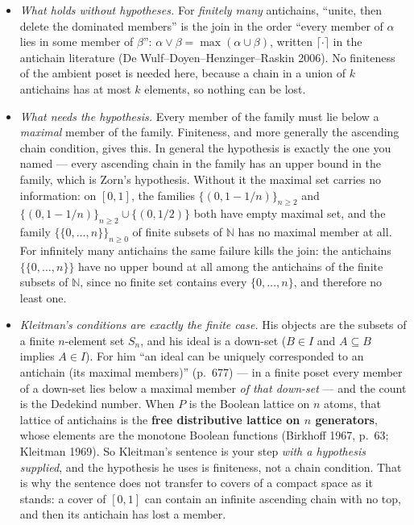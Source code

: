\documentclass[
]{article}
\providecommand{\tightlist}{%
  \setlength{\itemsep}{0pt}\setlength{\parskip}{0pt}}
\begin{document}
\begin{itemize}
\tightlist
\item
  \emph{What holds without hypotheses.} For \emph{finitely many}
  antichains, ``unite, then delete the dominated members'' is the join
  in the order ``every member of \(\alpha\) lies in some member of
  \(\beta\)'': \(\alpha\vee\beta=\max(\alpha\cup\beta)\), written
  \(\lceil\cdot\rceil\) in the antichain literature (De
  Wulf--Doyen--Henzinger--Raskin 2006). No finiteness of the ambient
  poset is needed here, because a chain in a union of \(k\) antichains
  has at most \(k\) elements, so nothing can be lost.
\item
  \emph{What needs the hypothesis.} Every member of the family must lie
  below a \emph{maximal} member of the family. Finiteness, and more
  generally the ascending chain condition, gives this. In general the
  hypothesis is exactly the one you named --- every ascending chain in
  the family has an upper bound in the family, which is Zorn's
  hypothesis. Without it the maximal set carries no information: on
  \([0,1]\), the families \(\{(0,1-1/n)\}_{n\ge2}\) and
  \(\{(0,1-1/n)\}_{n\ge2}\cup\{(0,1/2)\}\) both have empty maximal set,
  and the family \(\{\{0,\dots,n\}\}_{n\ge0}\) of finite subsets of
  \(\mathbb N\) has no maximal member at all. For infinitely many
  antichains the same failure kills the join: the antichains
  \(\{\{0,\dots,n\}\}\) have no upper bound at all among the antichains
  of the finite subsets of \(\mathbb N\), since no finite set contains
  every \(\{0,\dots,n\}\), and therefore no least one.
\item
  \emph{Kleitman's conditions are exactly the finite case.} His objects
  are the subsets of a finite \(n\)-element set \(S_n\), and his ideal
  is a down-set (\(B\in I\) and \(A\subseteq B\) implies \(A\in I\)).
  For him ``an ideal can be uniquely corresponded to an antichain (its
  maximal members)'' (p.~677) --- in a finite poset every member of a
  down-set lies below a maximal member \emph{of that down-set} --- and
  the count is the Dedekind number. When \(P\) is the Boolean lattice on
  \(n\) atoms, that lattice of antichains is the \textbf{free
  distributive lattice on \(n\) generators}, whose elements are the
  monotone Boolean functions (Birkhoff 1967, p.~63; Kleitman 1969). So
  Kleitman's sentence is your step \emph{with a hypothesis supplied},
  and the hypothesis he uses is finiteness, not a chain condition. That
  is why the sentence does not transfer to covers of a compact space as
  it stands: a cover of \([0,1]\) can contain an infinite ascending
  chain with no top, and then its antichain has lost a member.
\end{itemize}
\end{document}
